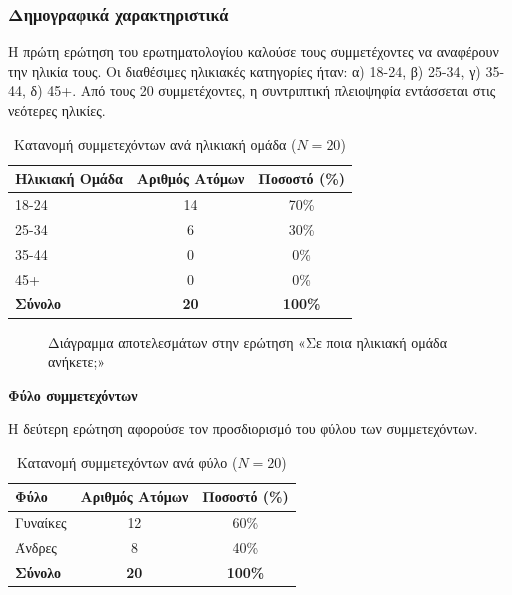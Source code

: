 \documentclass[twoside, a4paper, 11pt]{article}
\begin{document}
\subsubsection{Δημογραφικά χαρακτηριστικά} 

Η πρώτη ερώτηση του ερωτηματολογίου καλούσε τους συμμετέχοντες να αναφέρουν την ηλικία τους. Οι διαθέσιμες ηλικιακές κατηγορίες ήταν: α) 18-24, β) 25-34, γ) 35-44, δ) 45+. Από τους 20 συμμετέχοντες, η συντριπτική πλειοψηφία εντάσσεται στις νεότερες ηλικίες.

\begin{table}[H]
    \centering
    \caption{Κατανομή συμμετεχόντων ανά ηλικιακή ομάδα ($N = 20$)}
    \begin{tabular}{|l|c|c|}
        \hline
        \textbf{Ηλικιακή Ομάδα} & \textbf{Αριθμός Ατόμων} & \textbf{Ποσοστό (\%)} \\ \hline
        18-24 & 14 & 70\% \\ \hline
        25-34 & 6 & 30\% \\ \hline
        35-44 & 0 & 0\% \\ \hline
        45+ & 0 & 0\% \\ \hline
        \textbf{Σύνολο} & \textbf{20} & \textbf{100\%} \\ \hline
    \end{tabular}
\end{table}

\begin{figure}[H]
    \centering
    \caption{Διάγραμμα αποτελεσμάτων στην ερώτηση «Σε ποια ηλικιακή ομάδα ανήκετε;»}
\end{figure}

\vspace{1em}
\noindent\textbf{Φύλο συμμετεχόντων}

Η δεύτερη ερώτηση αφορούσε τον προσδιορισμό του φύλου των συμμετεχόντων. 

\begin{table}[H]
    \centering
    \caption{Κατανομή συμμετεχόντων ανά φύλο ($N = 20$)}
    \begin{tabular}{|l|c|c|}
        \hline
        \textbf{Φύλο} & \textbf{Αριθμός Ατόμων} & \textbf{Ποσοστό (\%)} \\ \hline
        Γυναίκες & 12 & 60\% \\ \hline
        Άνδρες & 8 & 40\% \\ \hline
        \textbf{Σύνολο} & \textbf{20} & \textbf{100\%} \\ \hline
    \end{tabular}
\end{table}
\end{document}
